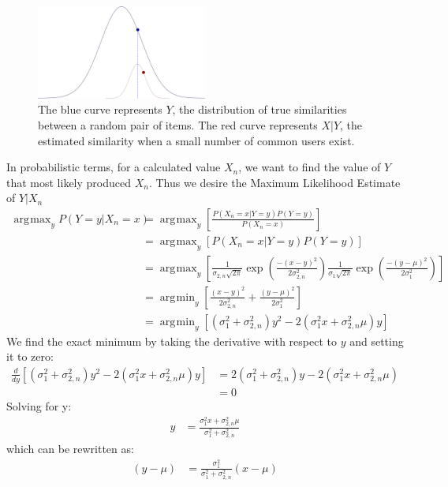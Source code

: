 \documentclass[10pt]{article}
\DeclareMathOperator*{\argmax}{arg\!\max}
\DeclareMathOperator*{\argmin}{arg\!\min}
\begin{document}
\begin{figure}[!htbp]
    \centering
    \includegraphics[width=0.5\textwidth]{twonormals.png}
    \caption{The blue curve represents $Y$, the distribution of true similarities
    between a random pair of items. The red curve represents $X|Y$, the
    estimated similarity when a small number of common users exist.}
    \label{fig:two_normals}
\end{figure}

In probabilistic terms, for a calculated value $X_n$, we want to find the value 
of $Y$ that most likely produced $X_n$. Thus we desire the Maximum Likelihood
Estimate of $Y | X_n$
\begin{align}
\argmax_yP(Y=y|X_n=x) &= \argmax_y\left[\frac{P(X_n=x |
Y=y)P(Y=y)}{P(X_n=x)}\right]
\\&= \argmax_y\left[P(X_n=x|Y=y)P(Y=y)\right]
\\&= 
\argmax_y\left[\frac{1}{\sigma_{2,n}\sqrt{2\pi}}\exp{\left(\frac{-(x-y)^2}{2\sigma_{2,n}^2}\right)}
\frac{1}{\sigma_{1}\sqrt{2\pi}}\exp{\left(\frac{-(y-\mu)^2}{2\sigma_{1}^2}\right)}\right]
\\&= \argmin_y\left[\frac{(x-y)^2}{2\sigma_{2,n}^2} +
\frac{(y-\mu)^2}{2\sigma_{1}^2}\right]
\\&= \argmin_y\left[\left(\sigma_{1}^2+\sigma_{2,n}^2\right)y^2 - 
2\left(\sigma_{1}^2x+\sigma_{2,n}^2\mu\right)y\right]
\end{align}
We find the exact minimum by taking the derivative with respect to $y$ and
setting it to zero:
\begin{align}
\frac{d}{dy}\left[\left(\sigma_{1}^2+\sigma_{2,n}^2\right)y^2 - 
2\left(\sigma_{1}^2x+\sigma_{2,n}^2\mu\right)y\right]
&= 2\left(\sigma_{1}^2+\sigma_{2,n}^2\right)y - 
2\left(\sigma_{1}^2x+\sigma_{2,n}^2\mu\right) 
\\&= 0
\end{align}
Solving for y:
\begin{align}
y &= \frac{\sigma_{1}^2x+\sigma_{2,n}^2\mu}{\sigma_{1}^2+\sigma_{2,n}^2}
\end{align}
which can be rewritten as:
\begin{align}
\left(y - \mu\right) &= \frac{\sigma_{1}^2}{\sigma_{1}^2+\sigma_{2,n}^2}\left(x-\mu\right)
\end{align}
\end{document}
